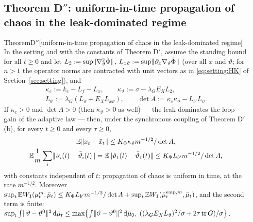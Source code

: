 \subsection*{Theorem D$''$: uniform-in-time propagation of chaos in the leak-dominated regime}

\begin{thm}{Theorem}{D$''$}[uniform-in-time propagation of chaos in the leak-dominated regime]
In the setting and with the constants of Theorem D$'$, assume the standing bound for all $t \ge 0$ and let
$L_2 := \sup\lVert \nabla^2_\vartheta\tilde\Phi\rVert$, $L_{x\vartheta} := \sup\lVert \partial_x\nabla_\vartheta\tilde\Phi\rVert$
(over all $x$ and $\vartheta$; for $n > 1$ the operator norms are contracted with unit vectors as in
\eqref{eq:setting:HK} of Section~\ref{sec:setting}), and
\begin{gather*}
  \kappa_e := k_e - L_f - L_x,\qquad \kappa_\vartheta := \sigma - \lambda_GE_XL_2,\\
  L_{b'} := \lambda_G(L_\vartheta + E_XL_{x\vartheta}),\qquad
  \det A := \kappa_e\kappa_\vartheta - L_{b'}L_\vartheta.
\end{gather*}
If $\kappa_e > 0$ and $\det A > 0$ (then $\kappa_\vartheta > 0$ as well) --- the leak dominates the loop gain of the
adaptive law --- then, under the synchronous coupling of Theorem D$'$(b), for every $t \ge 0$ and every $\tau \ge 0$,
\begin{gather*}
  \mathbb{E}\lVert x_t - \bar x_t\rVert \le K_\Phi\kappa_\vartheta m^{-1/2}/\det A,\\
  \mathbb{E}\frac1m\sum_i\lVert \vartheta_i(t) - \bar\vartheta_i(t)\rVert = \mathbb{E}\lVert \vartheta_1(t) - \bar\vartheta_1(t)\rVert
  \le K_\Phi L_{b'}m^{-1/2}/\det A,
\end{gather*}
with constants independent of $t$: propagation of chaos is uniform in time, at the rate $m^{-1/2}$. Moreover
$\sup_t\mathbb{E} W_1(\mu^m_t,\bar\mu_t) \le K_\Phi L_{b'}m^{-1/2}/\det A + \sup_t\mathbb{E} W_1(\bar\mu^{\mathrm{emp},m}_t,\bar\mu_t)$,
and the second term is finite:
$\sup_t\int\norm{\vartheta - \vartheta^0}^2\dd\bar\mu_t
\le \max\bigl\{\int\norm{\vartheta - \vartheta^0}^2\dd\bar\mu_0,\ ((\lambda_GE_XL_\vartheta)^2/\sigma + 2\tau\tr G)/\sigma\bigr\}$.
\end{thm}
